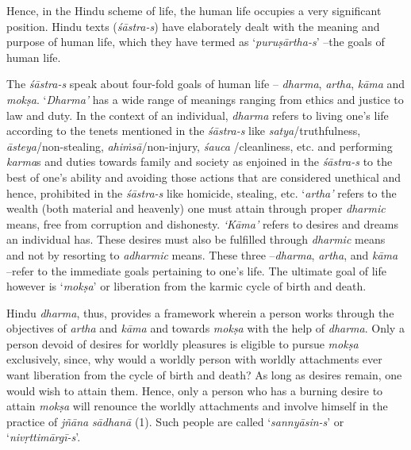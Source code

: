 Hence, in the Hindu scheme of life, the human life occupies a very significant position. Hindu texts (\emph{śāstra-s}) have elaborately dealt with the meaning and purpose of human life, which they have termed as `\emph{puruṣārtha-s}' --the goals of human life.
\vskip 4pt

The \emph{śāstra-s} speak about four-fold goals of human life -- \emph{dharma}, \emph{artha}, \emph{kāma} and \emph{mokṣa}. `\emph{Dharma'} has a wide range of meanings ranging from ethics and justice to law and duty. In the context of an individual, \emph{dharma} refers to living one's life according to the tenets mentioned in the \emph{śāstra-s} like \emph{satya}/truthfulness, \emph{āsteya}/non-stealing, \emph{ahiṁsā}/non-injury, \emph{śauca} /cleanliness, etc. and performing \emph{karma}s and duties towards family and society as enjoined in the \emph{śāstra-s} to the best of one's ability and avoiding those actions that are considered unethical and hence, prohibited in the \emph{śāstra-s} like homicide, stealing, etc. `\emph{artha'} refers to the wealth (both material and heavenly) one must attain through proper \emph{dharmic} means, free from corruption and dishonesty. \emph{`Kāma'} refers to desires and dreams an individual has. These desires must also be fulfilled through \emph{dharmic} means and not by resorting to \emph{adharmic} means. These three --\emph{dharma}, \emph{artha}, and \emph{kāma} --refer to the immediate goals pertaining to one's life. The ultimate goal of life however is `\emph{mokṣa}' or liberation from the karmic cycle of birth and death.
\vskip 4pt

Hindu \emph{dharma}, thus, provides a framework wherein a person works through the objectives of \emph{artha} and \emph{kāma} and towards \emph{mokṣa} with the help of \emph{dharma}. Only a person devoid of desires for worldly pleasures is eligible to pursue \emph{mokṣa} exclusively, since, why would a worldly person with worldly attachments ever want liberation from the cycle of birth and death? As long as desires remain, one would wish to attain them. Hence, only a person who has a burning desire to attain \emph{mokṣa} will renounce the worldly attachments and involve himself in the practice of \emph{jñāna} \emph{sādhanā} (1). Such people are called `\emph{sannyāsin-s}' or `\emph{nivṛttimārgī-s}'.

